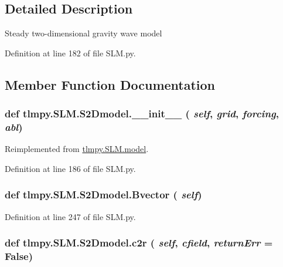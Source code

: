 \subsection{Detailed Description}
\begin{DoxyVerb}
Steady two-dimensional gravity wave model
\end{DoxyVerb}
 

Definition at line 182 of file SLM.py.

\subsection{Member Function Documentation}
\hypertarget{classtlmpy_1_1SLM_1_1S2Dmodel_a56982f807e406ff4aede8d4ac476b63a}{
\subsubsection[{\_\-\_\-init\_\-\_\-}]{\setlength{\rightskip}{0pt plus 5cm}def tlmpy.SLM.S2Dmodel.\_\-\_\-init\_\-\_\- ( {\em self}, \/   {\em grid}, \/   {\em forcing}, \/   {\em abl})}}
\label{classtlmpy_1_1SLM_1_1S2Dmodel_a56982f807e406ff4aede8d4ac476b63a}


Reimplemented from \hyperlink{classtlmpy_1_1SLM_1_1model_a9dda82ee48e8fd17f9fe6d1ae8d96e2d}{tlmpy.SLM.model}.

Definition at line 186 of file SLM.py.\hypertarget{classtlmpy_1_1SLM_1_1S2Dmodel_a1cc7320f379ebb0fb7ec8a026df7bce6}{
\subsubsection[{Bvector}]{\setlength{\rightskip}{0pt plus 5cm}def tlmpy.SLM.S2Dmodel.Bvector ( {\em self})}}
\label{classtlmpy_1_1SLM_1_1S2Dmodel_a1cc7320f379ebb0fb7ec8a026df7bce6}


Definition at line 247 of file SLM.py.\hypertarget{classtlmpy_1_1SLM_1_1S2Dmodel_af842ab31b38381cffff6c68e69dbbe7f}{
\subsubsection[{c2r}]{\setlength{\rightskip}{0pt plus 5cm}def tlmpy.SLM.S2Dmodel.c2r ( {\em self}, \/   {\em cfield}, \/   {\em returnErr} = {\ttfamily False})}}
\label{classtlmpy_1_1SLM_1_1S2Dmodel_af842ab31b38381cffff6c68e69dbbe7f}


